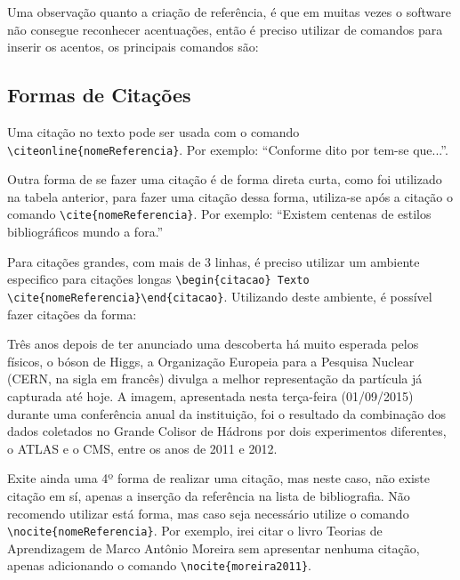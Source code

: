 Uma observação quanto a criação de referência, é que em muitas vezes o software não consegue reconhecer acentuações, então é preciso utilizar de comandos para inserir os acentos, os principais comandos são:
\begin{table}[htb]
\end{table}
\subsection{Formas de Citações}
Uma citação no texto pode ser usada com o comando \lstinline|\citeonline{nomeReferencia}|. Por exemplo: ``Conforme dito por  tem-se que...''.

Outra forma de se fazer uma citação é de forma direta curta, como foi utilizado na tabela anterior, para fazer uma citação dessa forma, utiliza-se após a citação o comando \lstinline|\cite{nomeReferencia}|. Por exemplo: ``Existem centenas de estilos bibliográficos mundo a fora.''\cite{araujo2016}

Para citações grandes, com mais de 3 linhas, é preciso utilizar um ambiente especifico para citações longas \lstinline|\begin{citacao} Texto \cite{nomeReferencia}\end{citacao}|. Utilizando deste ambiente, é possível fazer citações da forma:
\begin{citacao}
	Três anos depois de ter anunciado uma descoberta há muito esperada pelos físicos, o bóson de Higgs, a Organização Europeia para a Pesquisa Nuclear (CERN, na sigla em francês) divulga a melhor representação da partícula já capturada até hoje. A imagem, apresentada nesta terça-feira (01/09/2015) durante uma conferência anual da instituição, foi o resultado da combinação dos dados coletados no Grande Colisor de Hádrons por dois experimentos diferentes, o ATLAS e o CMS, entre os anos de 2011 e 2012. \cite{oliveira2015}
\end{citacao}

Exite ainda uma 4º forma de realizar uma citação, mas neste caso, não existe citação em sí, apenas a inserção da referência na lista de bibliografia. Não recomendo utilizar está forma, mas caso seja necessário utilize o comando \lstinline|\nocite{nomeReferencia}|. Por exemplo, irei citar o livro Teorias de Aprendizagem de Marco Antônio Moreira sem apresentar nenhuma citação, apenas adicionando o comando \lstinline|\nocite{moreira2011}|. \nocite{moreira2011}

